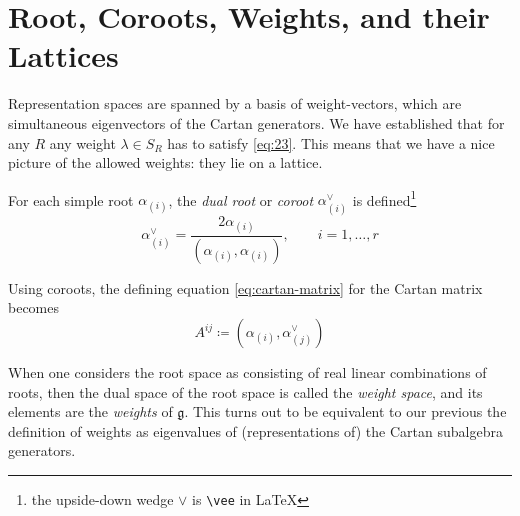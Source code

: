 
\section{Root, Coroots, Weights, and their Lattices}%
\label{sec:root_and_weight_lattices}

Representation spaces are spanned by a basis of weight-vectors, which are simultaneous eigenvectors of the Cartan generators.  We have established that for any $R$ any weight $\lambda \in S_R$ has to satisfy \eqref{eq:23}.
This means that we have a nice picture of the allowed weights: they lie on a lattice.

\begin{definition}[]
  For each simple root $\alpha_{(i)}$, the \emph{dual root} or \emph{coroot} $\alpha_{(i)}^{\vee}$ is defined\footnote{the upside-down wedge $\vee$ is \texttt{\textbackslash vee} in \LaTeX}
  \begin{equation}
    \alpha_{(i)}^\vee = \frac{2 \alpha_{(i)}}{(\alpha_{(i)}, \alpha_{(i)})}, \qquad i = 1, \dots, r
  \end{equation}
\end{definition}
\begin{leftbar}
  Using coroots, the defining equation \eqref{eq:cartan-matrix} for the Cartan matrix becomes
  \begin{equation}
    A^{ij} \coloneqq (\alpha_{(i)}, \alpha^\vee_{(j)})
  \end{equation}
\end{leftbar}

\begin{leftbar}
  When one considers the root space as consisting of real linear combinations of roots, then the dual space of the root space is called the \emph{weight space}, and its elements are the \emph{weights} of $\mathfrak{g}$. This turns out to be equivalent to our previous the definition of weights as eigenvalues of (representations of) the Cartan subalgebra generators. \cite[Sec.~13.2]{fuchs}
\end{leftbar}


